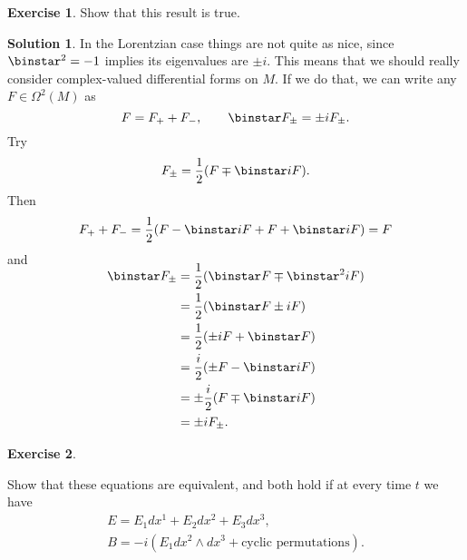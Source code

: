 \documentclass[11pt, a4paper]{report}
\theoremstyle{definition}
\newtheorem{exercise}{Exercise}[part]
\newtheorem{solution}{Solution}[part]
\newenvironment{ex}{\begin{exercise}}{\end{exercise}\pagebreak[1]}
\newenvironment{sol}{\begin{solution}}{\end{solution}\pagebreak[3]}
\renewcommand*{\star}{\ensuremath\mathop{}\mathopen\binstar\mathord{}}
\begin{document}
\begin{ex}

Show that this result is true.

\end{ex}

\begin{sol}

In the Lorentzian case things are not quite as nice, since $\star^2 = -1$ implies its eigenvalues are $\pm i$. This means that we should really consider complex-valued differential forms on $M$. If we do that, we can write any $F \in \Omega^2(M)$ as
\[
    F = F_+ + F_-, \qquad
    \star F_\pm = \pm i F_\pm.
\]
Try
\[
    F_\pm = \frac{1}{2} (F \mp \star i F).
\]
Then
\[
    F_+ + F_- = \frac{1}{2} (F - \star i F + F + \star i F) = F
\]
and
\begin{align*}
    \SwapAboveDisplaySkip
    \star F_\pm &= \frac{1}{2}(\star F \mp \star^2 i F) \\
                &= \frac{1}{2}(\star F \pm i F) \\
                &= \frac{1}{2}(\pm i F + \star F) \\
                &= \frac{i}{2}(\pm F - \star i F) \\
                &= \pm \frac{i}{2}(F \mp \star i F) \\
                &= \pm i F_\pm.
\end{align*}

\end{sol}

\begin{ex}\label{ex:ebselfdual}

Show that these equations are equivalent, and both hold if at every time $t$ we have
\begin{gather*}
    E = E_1 dx^1 + E_2 dx^2 + E_3 dx^3, \\
    B = -i (E_1 dx^2 \wedge dx^3 + \text{cyclic permutations}).
\end{gather*}

\end{ex}
\end{document}
